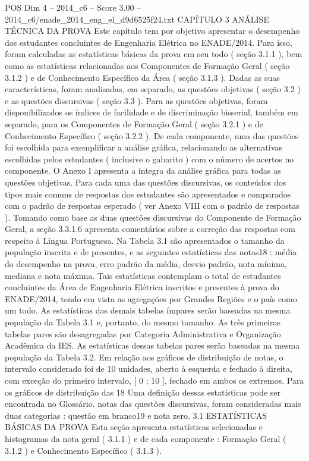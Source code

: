 \begin{textsample}{POS Dim 4 – 2014\_c6 – Score 3.00 – 2014\_c6/enade\_2014\_eng\_el\_d9d6525f24.txt}  \label{ex:f4_pos_080}
CAPÍTULO 3 ANÁLISE TÉCNICA DA PROVA Este capítulo tem por objetivo apresentar o desempenho dos estudantes concluintes de Engenharia Elétrica no ENADE/2014.
Para isso, foram calculadas as estatísticas básicas da prova em seu todo ( seção 3.1.1 ), bem como as estatísticas relacionadas aos Componentes de Formação Geral ( seção 3.1.2 ) e de Conhecimento Específico da Área ( seção 3.1.3 ).
Dadas as suas características, foram analisadas, em separado, as questões objetivas ( seção 3.2 ) e as questões discursivas ( seção 3.3 ).
Para as questões objetivas, foram disponibilizados os índices de facilidade e de discriminação bisserial, também em separado, para os Componentes de Formação Geral ( seção 3.2.1 ) e de Conhecimento Específico ( seção 3.2.2 ).
De cada componente, uma das questões foi escolhida para exemplificar a análise gráfica, relacionando as alternativas escolhidas pelos estudantes ( inclusive o gabarito ) com o número de acertos no componente.
O Anexo I apresenta a íntegra da análise gráfica para todas as questões objetivas.
Para cada uma das questões discursivas, os conteúdos dos tipos mais comuns de respostas dos estudantes são apresentados e comparados com o padrão de respostas esperado ( ver Anexo VIII com o padrão de respostas ).
Tomando como base as duas questões discursivas do Componente de Formação Geral, a seção 3.3.1.6 apresenta comentários sobre a correção das respostas com respeito à Língua Portuguesa.
Na Tabela 3.1 são apresentados o tamanho da população inscrita e de presentes, e as seguintes estatísticas das notas18 : média do desempenho na prova, erro padrão da média, desvio padrão, nota mínima, mediana e nota máxima.
Tais estatísticas contemplam o total de estudantes concluintes da Área de Engenharia Elétrica inscritos e presentes à prova do ENADE/2014, tendo em vista as agregações por Grandes Regiões e o país como um todo.
As estatísticas das demais tabelas ímpares serão baseadas na mesma população da Tabela 3.1 e, portanto, do mesmo tamanho.
As três primeiras tabelas pares são desagregadas por Categoria Administrativa e Organização Acadêmica da IES.
As estatísticas dessas tabelas pares serão baseadas na mesma população da Tabela 3.2.
Em relação aos gráficos de distribuição de notas, o intervalo considerado foi de 10 unidades, aberto à esquerda e fechado à direita, com exceção do primeiro intervalo, [ 0 ; 10 ], fechado em ambos os extremos.
Para os gráficos de distribuição das 18 Uma definição dessas estatísticas pode ser encontrada no Glossário. notas das questões discursivas, foram consideradas mais duas categorias : questão em branco19 e nota zero. 3.1 ESTATÍSTICAS BÁSICAS DA PROVA Esta seção apresenta estatísticas selecionadas e histogramas da nota geral ( 3.1.1 ) e de cada componente : Formação Geral ( 3.1.2 ) e Conhecimento Específico ( 3.1.3 ).

\end{textsample}
